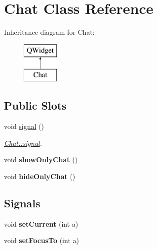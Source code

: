\hypertarget{class_chat}{}\section{Chat Class Reference}
\label{class_chat}
Inheritance diagram for Chat\+:\begin{figure}[H]
\begin{center}
\leavevmode
\includegraphics[height=2.000000cm]{class_chat}
\end{center}
\end{figure}
\subsection*{Public Slots}
\begin{DoxyCompactItemize}
\item 
void \hyperlink{class_chat_a7b94bde4d4e53034b558a0aa0b8b76eb}{signal} ()
\begin{DoxyCompactList}\small\item\em \hyperlink{class_chat_a7b94bde4d4e53034b558a0aa0b8b76eb}{Chat\+::signal}. \end{DoxyCompactList}\item 
\hypertarget{class_chat_aac15e09ec782dcee4a6f98492aa10633}{}void {\bfseries show\+Only\+Chat} ()\label{class_chat_aac15e09ec782dcee4a6f98492aa10633}

\item 
\hypertarget{class_chat_a7da9c4b3521928b4c85efce819a2e2d5}{}void {\bfseries hide\+Only\+Chat} ()\label{class_chat_a7da9c4b3521928b4c85efce819a2e2d5}

\end{DoxyCompactItemize}
\subsection*{Signals}
\begin{DoxyCompactItemize}
\item 
\hypertarget{class_chat_a49a01e63da7824bbd162d253a059fad8}{}void {\bfseries set\+Current} (int a)\label{class_chat_a49a01e63da7824bbd162d253a059fad8}

\item 
\hypertarget{class_chat_ac425c72f7a120ef313113083891a3966}{}void {\bfseries set\+Focus\+To} (int a)\label{class_chat_ac425c72f7a120ef313113083891a3966}

\end{DoxyCompactItemize}
